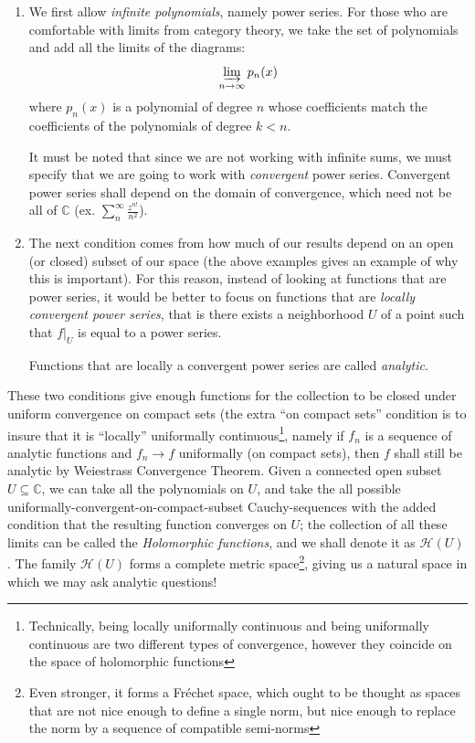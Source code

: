 \documentclass{article}
\newcommand{\C}{\mathbb{C}}
\newcommand{\CH}{\mathcal{H}}
\newcommand{\sse}{\subseteq}
\newcommand{\colim}{\varinjlim}
\begin{document}
\begin{enumerate}
  \item We first allow \emph{infinite polynomials}, namely power series. For those who are comfortable with
    limits from category theory, we take the set of polynomials and add all the limits of the diagrams:
    \[
      \colim_{n \to \infty} p_n(x)
    \]
    where $p_n(x)$ is a polynomial of degree $n$ whose coefficients match the coefficients of the polynomials of
    degree $k< n$.

    It must be noted that since we are not working with infinite sums, we must specify that we are going to
    work with \emph{convergent} power series. Convergent power series shall depend on the domain of
    convergence, which need not be all of $\C$ (ex. $\sum_n^\infty \frac{z^{n!}}{n^2}$).
   \item The next condition comes from how much of our results depend on an open (or closed) subset of our
     space (the above examples gives an example of why this is important). For this reason, instead of looking at functions
     that are power series, it would be better to focus on functions that are \emph{locally convergent power series},
     that is there exists a neighborhood $U$ of a point such that $f|_U$ is equal to a power series.

     Functions that are locally a convergent power series are called \emph{analytic}.
\end{enumerate}

These two conditions give enough functions for the collection to be closed under uniform convergence on
compact sets (the extra ``on compact sets'' condition is to insure that it is ``locally'' uniformally
continuous\footnote{Technically, being locally uniformally continuous and being uniformally continuous are two
different types of convergence, however they coincide on the space of holomorphic functions}, namely if $f_n$
is a sequence of analytic functions and  $f_n \to f$ uniformally (on compact sets), then $f$ shall still be
analytic by Weiestrass Convergence Theorem. Given a connected open subset $U \sse \C$, we can take all the
polynomials on $U$, and take the all possible uniformally-convergent-on-compact-subset Cauchy-sequences with
the added condition that the resulting function converges on $U$; the collection of all these limits can be
called the \emph{Holomorphic functions}, and we shall denote it as $\CH(U)$. The family $\CH(U)$ forms a
complete metric space\footnote{Even stronger, it forms a Fr\'echet space, which ought to be thought as spaces
  that are not nice enough to define a single norm, but nice enough to replace the norm by a sequence of
compatible semi-norms}, giving us a natural space in which we may ask analytic questions!
\end{document}
